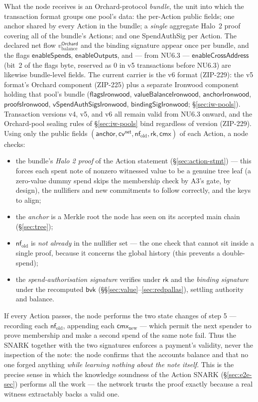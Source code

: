 \documentclass[11pt,a4paper]{article}
\theoremstyle{definition}
\newcommand{\nfsym}{\mathsf{nf}}
\newcommand{\cmx}{\mathsf{cmx}}
\newcommand{\cvsym}{\mathsf{cv}}
\newcommand{\rk}{\mathsf{rk}}
\begin{document}
What the node receives is an Orchard-protocol \emph{bundle}, the unit into
which the transaction format groups one pool's data: the per-Action
public fields; one anchor shared by every Action in the bundle; a
\emph{single} aggregate Halo~2 proof covering all of the bundle's Actions;
and one SpendAuthSig per Action. The declared net flow
$v_{\mathrm{balance}}^{\mathsf{Orchard}}$ and the binding signature appear
once per bundle, and the flags $\mathsf{enableSpends}$,
$\mathsf{enableOutputs}$, and --- from NU6.3 ---
$\mathsf{enableCrossAddress}$ (bit~2 of the flags byte, reserved as $0$ in
v5 transactions before NU6.3) are likewise bundle-level fields. The current
carrier is the v6 format (ZIP-229): the v5 format's Orchard component
(ZIP-225) plus a separate Ironwood component holding that pool's bundle
($\mathsf{flagsIronwood}$, $\mathsf{valueBalanceIronwood}$,
$\mathsf{anchorIronwood}$, $\mathsf{proofsIronwood}$,
$\mathsf{vSpendAuthSigsIronwood}$, $\mathsf{bindingSigIronwood}$;
\S\ref{sec:iw-pools}). Transaction versions v4, v5, and v6 all remain valid
from NU6.3 onward, and the Orchard-pool sealing rules of
\S\ref{sec:iw-pools} bind regardless of version (ZIP-229). Using only the
public fields
$(\mathsf{anchor}, \cvsym^{\mathsf{net}}, \nfsym_{\mathrm{old}}, \rk, \cmx)$ of
each Action, a node checks:
\begin{itemize}[leftmargin=*]
\item the bundle's \emph{Halo 2 proof} of the Action statement (\S\ref{sec:action-stmt})
--- this forces each spent note of nonzero witnessed value to be a genuine
tree leaf (a zero-value dummy spend skips the membership check by A3's
gate, by design), the nullifiers and new commitments to follow correctly,
and the keys to align;
\item the \emph{anchor} is a Merkle root the node has seen on its accepted main
chain (\S\ref{sec:tree});
\item $\nfsym_{\mathrm{old}}$ is \emph{not already} in the nullifier set --- the
one check that cannot sit inside a single proof, because it concerns the global
history (this prevents a double-spend);
\item the \emph{spend-authorisation signature} verifies under $\rk$ and the
\emph{binding signature} under the recomputed $\mathsf{bvk}$
(\S\S\ref{sec:value}--\ref{sec:redpallas}), settling authority and balance.
\end{itemize}
If every Action passes, the node performs the two state changes of step 5
--- recording each $\nfsym_{\mathrm{old}}$, appending each
$\cmx_{\mathrm{new}}$ --- which permit the next spender to prove membership
and make a second spend of the same note fail. Thus the SNARK together with the two signatures
enforces a payment's validity, never the inspection of the note: the node
confirms that the accounts balance and that no one forged anything \emph{while
learning nothing about the note itself}. This is the precise sense in which the
knowledge soundness of the Action SNARK (\S\ref{sec:e2e-sec}) performs all the
work --- the network trusts the proof exactly because a real witness extractably
backs a valid one.
\end{document}
